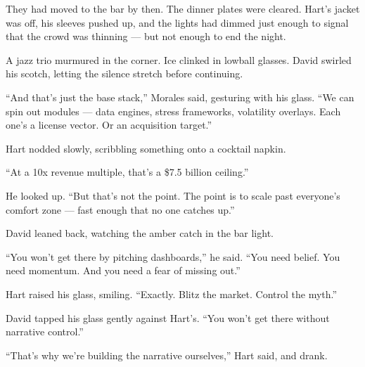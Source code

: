 \medskip

They had moved to the bar by then. The dinner plates were cleared. Hart’s jacket was off, his sleeves pushed up, and the 
lights had dimmed just enough to signal that the crowd was thinning — but not enough to end the night.

A jazz trio murmured in the corner. Ice clinked in lowball glasses. David swirled his scotch, letting the silence stretch 
before continuing.

\medskip

``And that’s just the base stack,'' Morales said, gesturing with his glass.  
``We can spin out modules — data engines, stress frameworks, volatility overlays.  
Each one’s a license vector. Or an acquisition target.''

Hart nodded slowly, scribbling something onto a cocktail napkin.

``At a 10x revenue multiple, that’s a \$7.5 billion ceiling.''

He looked up. ``But that’s not the point.  
The point is to scale past everyone’s comfort zone — fast enough that no one catches up.''

David leaned back, watching the amber catch in the bar light.

``You won’t get there by pitching dashboards,'' he said.  
``You need belief. You need momentum. And you need a fear of missing out.''

Hart raised his glass, smiling. ``Exactly. Blitz the market. Control the myth.''

David tapped his glass gently against Hart’s. ``You won’t get there without narrative control.''

``That’s why we’re building the narrative ourselves,'' Hart said, and drank.


\medskip

